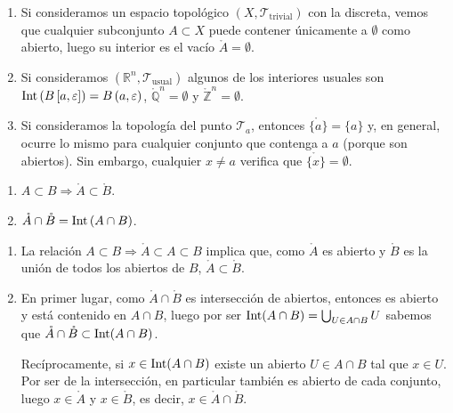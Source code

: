 \begin{ej}
\begin{enumerate}
    \item Si consideramos un espacio topológico $\left( X, \mathcal{T}_{\text{trivial}} \right)$ con la discreta, vemos que cualquier subconjunto $A\subset X$ puede contener únicamente a $\emptyset$ como abierto, luego su interior es el vacío $\mathring{A} = \emptyset$.

    \item Si consideramos $(\mathbb{R}^n, \mathcal{T}_{\text{usual}})$ algunos de los interiores usuales son $\operatorname{Int}\left( B\left[ a, \varepsilon \right] \right)  = B\left( a, \varepsilon \right)$, $\mathring{\mathbb{Q}}^n = \emptyset$ y $\mathring{\mathbb{Z}}^n = \emptyset$.
    
    \item Si consideramos la topología del punto $\mathcal{T}_a$, entonces $\mathring{\{a\}} = \{a\}$ y, en general, ocurre lo mismo para cualquier conjunto que contenga a $a$ (porque son abiertos). Sin embargo, cualquier $x \neq a$ verifica que $\mathring{\{x\}} = \emptyset$.
\end{enumerate}
\end{ej}

\begin{coro}
\begin{enumerate}
    \item $A \subset B \Rightarrow \mathring{A} \subset \mathring{B}$.
    \item $\mathring{A} \cap \mathring{B} = \operatorname{Int} \left( A \cap B \right)$.
\end{enumerate}
\end{coro}
\begin{demo}
\begin{enumerate}
    \item La relación $A \subset B \Rightarrow \mathring{A} \subset A \subset B$ implica que, como $\mathring{A}$ es abierto y $\mathring{B}$ es la unión de todos los abiertos de $B$, $\mathring{A} \subset \mathring{B}$.
    \item En primer lugar, como $\mathring{A}\cap \mathring{B}$ es intersección de abiertos, entonces es abierto y está contenido en $A\cap B$, luego por ser $\operatorname{Int}(A\cap B) = \bigcup_{U\in A\cap B}U$ sabemos que $\mathring{A}\cap \mathring{B} \subset \operatorname{Int}(A\cap B)$.
    
	Recíprocamente, si $x\in \operatorname{Int}(A\cap B)$ existe un abierto $U \in A\cap B$ tal que $x\in U$. Por ser de la intersección, en particular también es abierto de cada conjunto, luego $x\in \mathring{A}$ y $x\in \mathring{B}$, es decir, $x\in \mathring{A}\cap \mathring{B}$.
\end{enumerate}
\end{demo}

